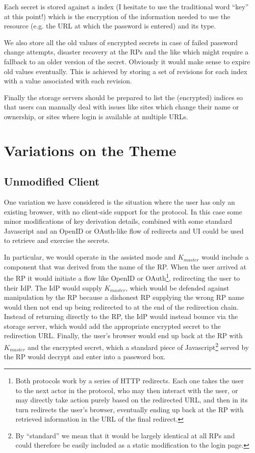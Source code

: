 \documentclass[a4paper,titlepage]{article}
\begin{document}
Each secret is stored against a index (I hesitate to use the
traditional word ``key'' at this point!) which is the encryption of
the information needed to use the resource (e.g. the URL at which the
password is entered) and its type.

We also store all the old values of encrypted secrets in case of
failed password change attempts, disaster recovery at the RPs and the
like which might require a fallback to an older version of the
secret. Obviously it would make sense to expire old values eventually.
This is achieved by storing a set of revisions for each index with
a value associated with each revision.

Finally the storage servers should be prepared to list the (encrypted)
indices so that users can manually deal with issues like sites
which change their name or ownership, or sites where login is
available at multiple URLs.

\section{Variations on the Theme}

\subsection{Unmodified Client}

One variation we have considered is the situation where the user has
only an existing browser, with no client-side support for the
protocol. In this case some minor modifications of key derivation
details, combined with some standard Javascript and an OpenID or
OAuth-like flow of redirects and UI could be used to retrieve and
exercise the secrets.

In particular, we would operate in the assisted mode and $K_{master}$
would include a component that was derived from the name of the
RP. When the user arrived at the RP it would initiate a flow like
OpenID or OAuth\footnote{Both protocols work by a series of HTTP
  redirects. Each one takes the user to the next actor in the
  protocol, who may then interact with the user, or may directly take
  action purely based on the redirected URL, and then in its turn
  redirects the user's browser, eventually ending up back at the RP
  with retrieved information in the URL of the final redirect.},
redirecting the user to their IdP. The IdP would supply $K_{master}$,
which would be defended against manipulation by the RP because a
dishonest RP supplying the wrong RP name would then not end up being
redirected to at the end of the redirection chain. Instead of
returning directly to the RP, the IdP would instead bounce via the
storage server, which would add the appropriate encrypted secret to
the redirection URL. Finally, the user's browser would end up back at
the RP with $K_{master}$ and the encrypted secret, which a standard
piece of Javascript\footnote{By ``standard'' we mean that it would be
  largely identical at all RPs and could therefore be easily included
  as a static modification to the login page.} served by the RP would
decrypt and enter into a password box.
\end{document}
